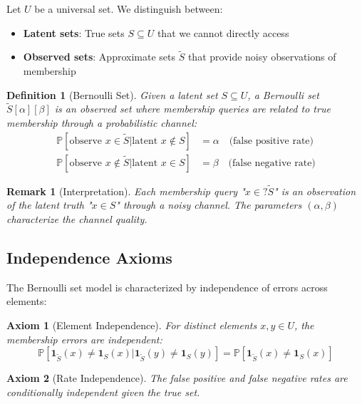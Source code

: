 \documentclass[11pt,final,hidelinks]{article}
\newtheorem{definition}[theorem]{Definition}
\newtheorem{remark}[theorem]{Remark}
\newtheorem{axiom}{Axiom}
\newcommand{\obs}[1]{\widetilde{#1}}  %
\newcommand{\Prob}[1]{\mathbb{P}\left[#1\right]}
\newcommand{\Indicator}[1]{\mathbf{1}_{#1}}
\newcommand{\fprate}{\alpha}
\newcommand{\fnrate}{\beta}
\begin{document}
Let $U$ be a universal set. We distinguish between:
\begin{itemize}
    \item \textbf{Latent sets}: True sets $S \subseteq U$ that we cannot directly access
    \item \textbf{Observed sets}: Approximate sets $\obs{S}$ that provide noisy observations of membership
\end{itemize}

\begin{definition}[Bernoulli Set]
Given a latent set $S \subseteq U$, a Bernoulli set $\obs{S}[\fprate][\fnrate]$ is an observed set where membership queries are related to true membership through a probabilistic channel:
\begin{align}
\Prob{\text{observe } x \in \obs{S} | \text{latent } x \notin S} &= \fprate \quad \text{(false positive rate)} \\
\Prob{\text{observe } x \notin \obs{S} | \text{latent } x \in S} &= \fnrate \quad \text{(false negative rate)}
\end{align}
\end{definition}

\begin{remark}[Interpretation]
Each membership query "$x \in? \obs{S}$" is an observation of the latent truth "$x \in S$" through a noisy channel. The parameters $(\fprate, \fnrate)$ characterize the channel quality.
\end{remark}

\subsection{Independence Axioms}

The Bernoulli set model is characterized by independence of errors across elements:

\begin{axiom}[Element Independence]
For distinct elements $x, y \in U$, the membership errors are independent:
\begin{equation}
\Prob{\Indicator{\obs{S}}(x) \neq \Indicator{S}(x) | \Indicator{\obs{S}}(y) \neq \Indicator{S}(y)} = 
\Prob{\Indicator{\obs{S}}(x) \neq \Indicator{S}(x)}
\end{equation}
\end{axiom}

\begin{axiom}[Rate Independence]
The false positive and false negative rates are conditionally independent given the true set.
\end{axiom}
\end{document}
